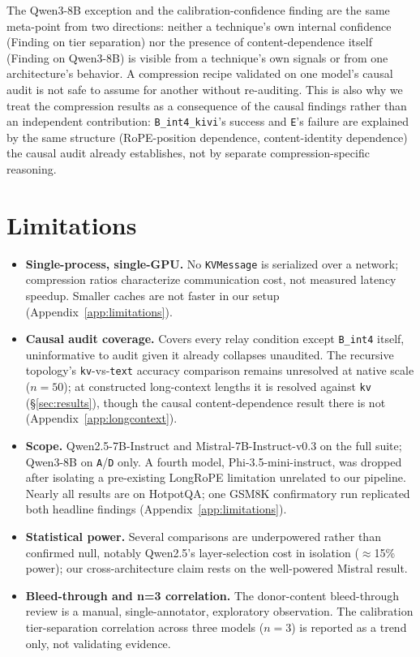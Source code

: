 \documentclass[11pt]{article}
\begin{document}
The Qwen3-8B exception and the calibration-confidence finding are the
same meta-point from two directions: neither a technique's own internal
confidence (Finding on tier separation) nor the presence of
content-dependence itself (Finding on Qwen3-8B) is visible from a
technique's own signals or from one architecture's behavior. A
compression recipe validated on one model's causal audit is not safe to
assume for another without re-auditing. This is also why we treat the
compression results as a consequence of the causal findings rather than
an independent contribution: \texttt{B\_int4\_kivi}'s success and
\texttt{E}'s failure are explained by the same structure (RoPE-position
dependence, content-identity dependence) the causal audit already
establishes, not by separate compression-specific reasoning.

\section{Limitations}
\label{sec:limitations}

\begin{itemize}[leftmargin=*]
\item \textbf{Single-process, single-GPU.} No \texttt{KVMessage} is
serialized over a network; compression ratios characterize
communication cost, not measured latency speedup. Smaller caches are
not faster in our setup (Appendix~\ref{app:limitations}).
\item \textbf{Causal audit coverage.} Covers every relay condition
except \texttt{B\_int4} itself, uninformative to audit given it already
collapses unaudited. The recursive topology's \texttt{kv}-vs-\texttt{text}
accuracy comparison remains unresolved at native scale ($n=50$); at
constructed long-context lengths it is resolved against \texttt{kv}
(\S\ref{sec:results}), though the causal content-dependence result
there is not (Appendix~\ref{app:longcontext}).
\item \textbf{Scope.} Qwen2.5-7B-Instruct and Mistral-7B-Instruct-v0.3
on the full suite; Qwen3-8B on \texttt{A}/\texttt{D} only. A fourth
model, Phi-3.5-mini-instruct, was dropped after isolating a pre-existing
LongRoPE limitation unrelated to our pipeline. Nearly all results are on
HotpotQA; one GSM8K confirmatory run replicated both headline findings
(Appendix~\ref{app:limitations}).
\item \textbf{Statistical power.} Several comparisons are
underpowered rather than confirmed null, notably Qwen2.5's
layer-selection cost in isolation ($\approx$15\% power); our
cross-architecture claim rests on the well-powered Mistral result.
\item \textbf{Bleed-through and n=3 correlation.} The donor-content
bleed-through review is a manual, single-annotator, exploratory
observation. The calibration tier-separation correlation across three
models ($n=3$) is reported as a trend only, not validating evidence.
\end{itemize}
\end{document}
